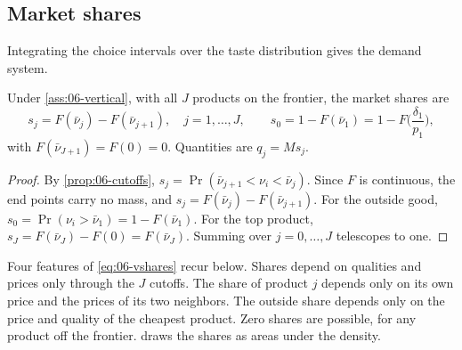 \subsection{Market shares}\label{sec:06-vshares}

Integrating the choice intervals over the taste distribution gives the demand system.

\begin{proposition}\label{prop:06-vshares}
Under \cref{ass:06-vertical}, with all $J$ products on the frontier, the market shares are
\begin{equation}\label{eq:06-vshares}
  s_j = F(\bar\nu_j) - F(\bar\nu_{j+1}), \quad j = 1, \dots, J, \qquad
  s_0 = 1 - F(\bar\nu_1) = 1 - F\Big(\frac{\delta_1}{p_1}\Big),
\end{equation}
with $F(\bar\nu_{J+1}) = F(0) = 0$. Quantities are $q_j = M s_j$.
\end{proposition}

\begin{proof}
By \cref{prop:06-cutoffs}, $s_j = \Pr(\bar\nu_{j+1} < \nu_i < \bar\nu_j)$. Since $F$ is continuous, the end points
carry no mass, and $s_j = F(\bar\nu_j) - F(\bar\nu_{j+1})$. For the outside good, $s_0 = \Pr(\nu_i > \bar\nu_1) =
1 - F(\bar\nu_1)$. For the top product, $s_J = F(\bar\nu_J) - F(0) = F(\bar\nu_J)$. Summing over
$j = 0, \dots, J$ telescopes to one.
\end{proof}

Four features of \eqref{eq:06-vshares} recur below. Shares depend on qualities and prices only through
the $J$ cutoffs. The share of product $j$ depends only on its own price and the prices of its two
neighbors. The outside share depends only on the price and quality of the cheapest product. Zero shares
are possible, for any product off the frontier.  draws the shares as areas under the
density.

